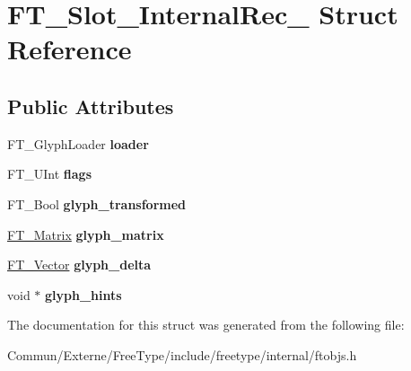 \hypertarget{struct_f_t___slot___internal_rec__}{}\section{F\+T\+\_\+\+Slot\+\_\+\+Internal\+Rec\+\_\+ Struct Reference}
\label{struct_f_t___slot___internal_rec__}
\subsection*{Public Attributes}
\begin{DoxyCompactItemize}
\item 
F\+T\+\_\+\+Glyph\+Loader {\bfseries loader}\hypertarget{struct_f_t___slot___internal_rec___ac57f8c939f667938ab9f986088c15d8f}{}\label{struct_f_t___slot___internal_rec___ac57f8c939f667938ab9f986088c15d8f}

\item 
F\+T\+\_\+\+U\+Int {\bfseries flags}\hypertarget{struct_f_t___slot___internal_rec___a9a2a287ba2b363197b36fe24d2f48746}{}\label{struct_f_t___slot___internal_rec___a9a2a287ba2b363197b36fe24d2f48746}

\item 
F\+T\+\_\+\+Bool {\bfseries glyph\+\_\+transformed}\hypertarget{struct_f_t___slot___internal_rec___ac2bba891ac70016b74c085a05c1f182c}{}\label{struct_f_t___slot___internal_rec___ac2bba891ac70016b74c085a05c1f182c}

\item 
\hyperlink{struct_f_t___matrix__}{F\+T\+\_\+\+Matrix} {\bfseries glyph\+\_\+matrix}\hypertarget{struct_f_t___slot___internal_rec___a95af217daf1c2080692b5a69e345aa3b}{}\label{struct_f_t___slot___internal_rec___a95af217daf1c2080692b5a69e345aa3b}

\item 
\hyperlink{struct_f_t___vector__}{F\+T\+\_\+\+Vector} {\bfseries glyph\+\_\+delta}\hypertarget{struct_f_t___slot___internal_rec___a2a94b955dd1e260aaf8699238d44769d}{}\label{struct_f_t___slot___internal_rec___a2a94b955dd1e260aaf8699238d44769d}

\item 
void $\ast$ {\bfseries glyph\+\_\+hints}\hypertarget{struct_f_t___slot___internal_rec___a16337853823cdccfb0c636673c4eb3ae}{}\label{struct_f_t___slot___internal_rec___a16337853823cdccfb0c636673c4eb3ae}

\end{DoxyCompactItemize}


The documentation for this struct was generated from the following file\+:\begin{DoxyCompactItemize}
\item 
Commun/\+Externe/\+Free\+Type/include/freetype/internal/ftobjs.\+h\end{DoxyCompactItemize}
